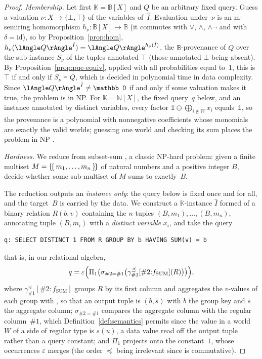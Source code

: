 \begin{proof}
  \emph{Membership.} Let first $\mathbb K=\mathbb B[X]$ and $Q$ be an
  arbitrary fixed  query. Guess a valuation
  $\nu\colon X\to\{\bot,\top\}$ of the variables of~$\hat I$. Evaluation
  under~$\nu$ is an m-semiring homomorphism $h_\nu\colon\mathbb
  B[X]\to\mathbb B$ (it commutes with $\lor$, $\land$, $\land\lnot$ and
  with $\delta=\mathrm{id}$), so by Proposition~\ref{prop:hom},
  $h_\nu(\angsem{\hat I}{Q})=\angsem{h_\nu(\hat I)}{Q}$, the
  $\mathbb B$-provenance of $Q$ over the sub-instance $S_\nu$ of the tuples
  annotated $\top$ (those annotated $\bot$ being absent). By
  Proposition~\ref{prop:pqe-equiv}, applied with all probabilities equal
  to~$1$, this is $\top$ if and only if $S_\nu\models Q$, which is decided
  in polynomial time in data complexity. Since $\angsem{\hat I}{Q}\neq\mathbb
  0$ if and only if some valuation makes it true, the problem is in NP.
  For $\mathbb K=\mathbb N[X]$, the fixed query~$q$ below, and an instance
  annotated by distinct variables, every factor $\mathbb
  1\ominus\bigoplus_{i\notin W}x_i$ equals~$\mathbb 1$, so the provenance is
  a polynomial with nonnegative coefficients whose monomials are exactly the
  valid worlds; guessing one world and checking its sum places the problem
  in NP
  .

  \emph{Hardness.} We reduce from subset-sum \cite{DBLP:conf/coco/Karp72}, a
  classic NP-hard problem: given a finite multiset $M=\{\!\{\,m_1,\dots,m_n\,\}\!\}$ of
  natural numbers and a positive integer $B$, decide whether some
  sub-multiset of $M$ sums to exactly~$B$.

  The reduction outputs an \emph{instance only}: the query below is fixed
  once and for all, and the target~$B$ is carried by the data. We construct a
  $\mathbb{K}$-instance $\hat I$ formed of a binary relation $R(b,v)$
  containing the $n$ tuples $(B,m_1),\dots,(B,m_n)$, annotating tuple
  $(B,m_i)$ with a \emph{distinct variable} $x_i$, and take the query
  \begin{verbatim}
q: SELECT DISTINCT 1 FROM R GROUP BY b HAVING SUM(v) = b
  \end{verbatim}
  that is, in our relational algebra,
  \[
    q=\varepsilon\Bigl(\Pi_{1}\bigl(
        \sigma_{\#2=\#1}\bigl(
          \gamma^{\preceq}_{\#1}[\#2{:}f_{\mathrm{SUM}}](R)\bigr)
      \bigr)\Bigr),
  \]
  where $\gamma^{\preceq}_{\#1}[\#2{:}f_{\mathrm{SUM}}]$ groups $R$ by its
  first column and aggregates the $v$-values of each group with , so
  that an output tuple is $(b,s)$ with $b$ the group key and $s$ the
  aggregate column; $\sigma_{\#2=\#1}$ compares the aggregate column with the
  regular column~$\#1$, which Definition~\ref{def:semantics} permits since
  the value in a world~$W$ of a side of regular type is $s(u)$, a data value
  read off the output tuple rather than a query constant; and $\Pi_1$
  projects onto the constant~$1$, whose occurrences $\varepsilon$ merges
  (the order $\preceq$ being irrelevant since  is commutative).


\end{proof}
